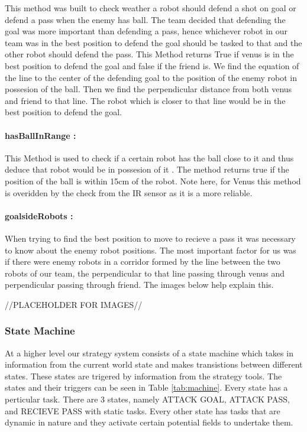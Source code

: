 \documentclass[a4paper,12pt]{article}
\begin{document}
This method was built to check weather a robot should defend a shot on goal or defend a pass when the enemy has ball. The team decided that defending the goal was more important than defending a pass, hence whichever robot in our team was in the best position to defend the goal should be tasked to that and the other robot should defend the pass. This Method returns True if venus is in the best position to defend the goal and false if the friend is. We find the equation of the line to the center of the defending goal to the position of the enemy robot in possesion of the ball. Then we find the perpendicular distance from both venus and friend to that line. The robot which is closer to that line would be in the best position to defend the goal.

\paragraph{hasBallInRange : }

This Method is used to check if a certain robot has the ball close to it and thus deduce that robot would be in possesion of it . The method returns true if the position of the ball is within 15cm of the robot. Note here, for Venus this method is overidden by the check from the IR sensor as it is a more reliable.

\paragraph{goalsideRobots : }

When trying to find the best position to move to recieve a pass it was necessary to know about the enemy robot positions. The most important factor for us was if there were enemy robots in a corridor formed by the line between the two robots of our team, the perpendicular to that line passing through venus and perpendicular passing through friend. The images below help explain this.

//PLACEHOLDER FOR IMAGES//

\subsubsection {State Machine}
At a higher level our strategy system consists of a state machine which takes in information from the current world state and makes transistions between different states. These states are trigered by information from the strategy tools. The states and their triggers can be seen in Table \ref{tab:machine}. Every state has a perticular task. There are 3 states, namely ATTACK GOAL, ATTACK PASS, and RECIEVE PASS with static tasks. Every other state has tasks that are dynamic in nature and they activate certain potential fields to undertake them. 
\end{document}
